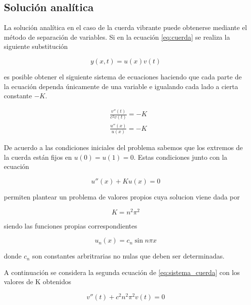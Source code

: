 \documentclass[11pt]{article}
\begin{document}
\subsection{Solución analítica}
\label{sec:sol_analitica}
La solución analítica en el caso de la cuerda vibrante puede obtenerse mediante el método
de separación de variables. Si en la ecuación \eqref{eq:cuerda} se realiza la siguiente
substitución

\begin{equation}
y(x,t) = u(x)v(t)
\end{equation}

es posible obtener el siguiente sistema de ecuaciones haciendo que cada parte de la ecuación
dependa únicamente de una variable e igualando cada lado a cierta constante $-K$.

\begin{subequations}
\begin{flalign}
	&\frac{v''(t)}{c^2v(t)} = -K\\
	&\frac{u''(x)}{u(x)} = -K
\end{flalign}
\label{eq:sistema_cuerda}
\end{subequations}

De acuerdo a las condiciones iniciales del problema sabemos que los extremos de la cuerda
están fijos en $u(0) = u(1) = 0$. Estas condiciones junto con la ecuación

\begin{equation}
	u''(x) + Ku(x) = 0
\end{equation}

permiten plantear un problema de valores propios cuya solucion viene dada por

\begin{equation}
	K = n^2\pi^2
\end{equation}

siendo las funciones propias correspondientes

\begin{equation}
	u_n(x) = c_n\sin{n\pi{x}}
\end{equation}

donde $c_n$ son constantes arbritrarias no nulas que deben ser determinadas.

A continuación se considera la segunda ecuación de \eqref{eq:sistema_cuerda} con los
valores de K obtenidos

\begin{equation}
	v''(t) + c^2n^2\pi^2v(t) = 0
\end{equation}
 
\end{document}

